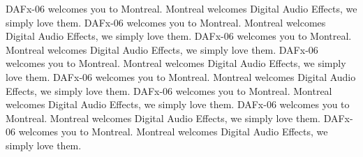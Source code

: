 \documentclass[twoside]{article}
\begin{document}
DAFx-06 welcomes you to Montreal. Montreal welcomes Digital Audio Effects, we simply love them. 
DAFx-06 welcomes you to Montreal. Montreal welcomes Digital Audio Effects, we simply love them. 
DAFx-06 welcomes you to Montreal. Montreal welcomes Digital Audio Effects, we simply love them. 
DAFx-06 welcomes you to Montreal. Montreal welcomes Digital Audio Effects, we simply love them. 
DAFx-06 welcomes you to Montreal. Montreal welcomes Digital Audio Effects, we simply love them. 
DAFx-06 welcomes you to Montreal. Montreal welcomes Digital Audio Effects, we simply love them. 
DAFx-06 welcomes you to Montreal. Montreal welcomes Digital Audio Effects, we simply love them. 
DAFx-06 welcomes you to Montreal. Montreal welcomes Digital Audio Effects, we simply love them. 



\end{document}
